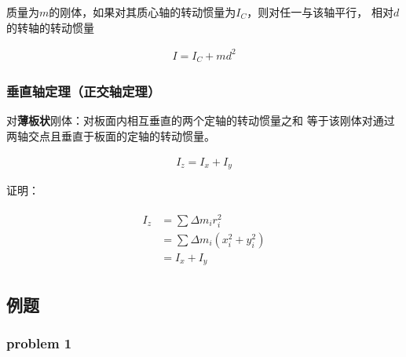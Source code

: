\documentclass[12pt, a4paper]{article}
\numberwithin{equation}{section}
\begin{document}
    质量为\(m\)的刚体，如果对其质心轴的转动惯量为\(I_{C}\)，则对任一与该轴平行，
    相对\(d\)的转轴的转动惯量

    \begin{align}
        I = I_{C} + md^2
    \end{align}

\subsubsection{垂直轴定理（正交轴定理）}

    对\textbf{薄板状}刚体：对板面内相互垂直的两个定轴的转动惯量之和
    等于该刚体对通过两轴交点且垂直于板面的定轴的转动惯量。

    \begin{align}
        I_{z} = I_{x} + I_{y}
    \end{align}

    证明：

    \begin{align*}
        \begin{aligned}
            I_{z} &= \sum \Delta m_{i}r_{i}^2 \\
            &= \sum \Delta m_{i}\left(x_{i}^2 + y_{i}^2\right) \\
            &= I_{x} + I_{y}
        \end{aligned}
    \end{align*}

\subsection{例题}

\subsubsection{problem 1}
\end{document}
